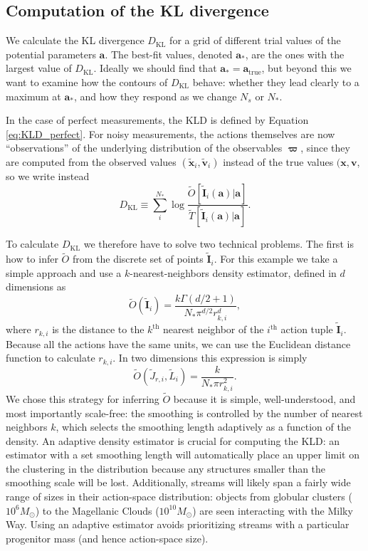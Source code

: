 \documentclass[useAMS,usenatbib,a4paper]{mn2e}
\newcommand{\sub}[2]{\ensuremath{#1_{\mathrm{#2}}}}
\newcommand{\super}[2]{\ensuremath{#1^{\mathrm{#2}}}}
\begin{document}
\subsection{Computation of the KL divergence}
We calculate the KL divergence $\sub{D}{KL}$ for a grid of different trial values of the potential parameters $\mathbf{a}$. The best-fit values, denoted $\mathbf{a}_*$, are the ones with the largest value of $\sub{D}{KL}$. Ideally we should find that $\mathbf{a}_* = \sub{\mathbf{a}}{true}$, but beyond this we want to examine how the contours of $\sub{D}{KL}$ behave: whether they lead clearly to a maximum at $\mathbf{a}_*$, and how they respond as we change $N_s$ or $N_*$. 

In the case of perfect measurements, the KLD is defined by Equation \eqref{eq:KLD_perfect}.  For noisy measurements, the actions themselves are now ``observations'' of the underlying distribution of the observables $\mathbf{\varpi}$, since they are computed from the observed values $(\tilde{\mathbf{x}}_i,\tilde{\mathbf{v}}_i)$ instead of the true values $(\mathbf{x}, \mathbf{v}$, so we write instead
\begin{equation}
\sub{D}{KL} \equiv \sum_i^{N_*} \log \frac{\tilde{O}[\tilde{\mathbf{I}}_i(\mathbf{a})|\mathbf{a}]}{\tilde{T}[\tilde{\mathbf{I}}_i(\mathbf{a})|\mathbf{a}]}.
\end{equation} 

To calculate $\sub{D}{KL}$ we therefore have to solve two technical problems. The first is how to infer $\tilde{O}$ from the discrete set of points $\tilde{\mathbf{I}}_i$. For this example we take a simple approach and use a $k$-nearest-neighbors density estimator, defined in $d$ dimensions as
\begin{equation}
 \tilde{O}(\tilde{\mathbf{I}}_i) = \frac{k \Gamma\left(d/2 + 1\right)}{N_* \pi^{d/2} r_{k,i}^d},
\end{equation} 
where $r_{k,i}$ is the distance to the $\super{k}{th}$ nearest neighbor of the $\super{i}{th}$ action tuple $\tilde{\mathbf{I}}_i$. Because all the actions have the same units, we can use the Euclidean distance function to calculate $r_{k,i}$. In two dimensions this expression is simply
\begin{equation}
 \tilde{O}(\tilde{J}_{r,i},\tilde{L}_i) = \frac{ k }{N_* \pi r_{k,i}^2}.
\end{equation}
We chose this strategy for inferring $\tilde{O}$ because it is simple, well-understood, and most importantly scale-free: the smoothing is controlled by the number of nearest neighbors $k$, which selects the smoothing length adaptively as a function of the density. An adaptive density estimator is crucial for computing the KLD: an estimator with a set smoothing length will automatically place an upper limit on the clustering in the distribution because any structures smaller than the smoothing scale will be lost. Additionally, streams will likely span a fairly wide range of sizes in their action-space distribution: objects from globular clusters ($10^6 M_\odot$) to the Magellanic Clouds ($10^{10} M_\odot$) are seen interacting with the Milky Way. Using an adaptive estimator avoids prioritizing streams with a particular progenitor mass (and hence action-space size). 
\end{document}
